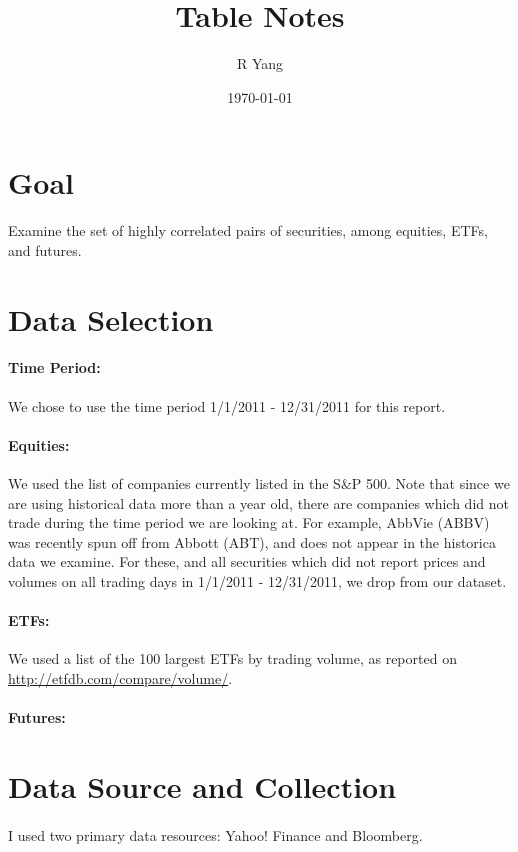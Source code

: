 \documentclass[11pt]{article}
\title{\textbf{Table Notes}}
\author{R Yang}
\date{\today}
\begin{document}
\maketitle

\section{Goal}
Examine the set of highly correlated pairs of securities, among equities, ETFs, and futures.

\section{Data Selection}

\paragraph{Time Period:} We chose to use the time period 1/1/2011 - 12/31/2011 for this report.

\paragraph{Equities:} We used the list of companies currently listed in the S\&P 500. Note that since we are using historical data more than a year old, there are companies which did not trade during the time period we are looking at. For example, AbbVie (ABBV) was recently spun off from Abbott (ABT), and does not appear in the historica data we examine. For these, and all securities which did not report prices and volumes on all trading days in 1/1/2011 - 12/31/2011, we drop from our dataset.

\paragraph{ETFs:} We used a list of the 100 largest ETFs by trading volume, as reported on \url{http://etfdb.com/compare/volume/}.

\paragraph{Futures:}


\section{Data Source and Collection}
\paragraph{}
I used two primary data resources: Yahoo! Finance and Bloomberg. 
\end{document}
